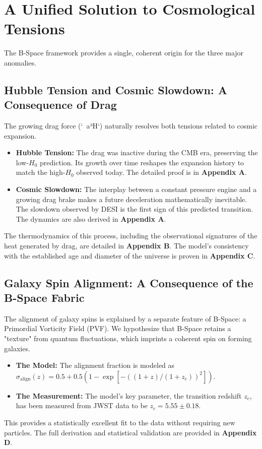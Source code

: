 \documentclass{BSpacePaper} %
\begin{document}
\section{A Unified Solution to Cosmological Tensions}
The B-Space framework provides a single, coherent origin for the three major anomalies.

\subsection{Hubble Tension and Cosmic Slowdown: A Consequence of Drag}
The growing drag force (`~a³H`) naturally resolves both tensions related to cosmic expansion.
\begin{itemize}
    \item \textbf{Hubble Tension:} The drag was inactive during the CMB era, preserving the low-$H_0$ prediction. Its growth over time reshapes the expansion history to match the high-$H_0$ observed today. The detailed proof is in \textbf{Appendix A}.
    \item \textbf{Cosmic Slowdown:} The interplay between a constant pressure engine and a growing drag brake makes a future deceleration mathematically inevitable. The slowdown observed by DESI is the first sign of this predicted transition. The dynamics are also derived in \textbf{Appendix A}.
\end{itemize}
The thermodynamics of this process, including the observational signatures of the heat generated by drag, are detailed in \textbf{Appendix B}. The model's consistency with the established age and diameter of the universe is proven in \textbf{Appendix C}.

\subsection{Galaxy Spin Alignment: A Consequence of the B-Space Fabric}
The alignment of galaxy spins is explained by a separate feature of B-Space: a Primordial Vorticity Field (PVF). We hypothesize that B-Space retains a "texture" from quantum fluctuations, which imprints a coherent spin on forming galaxies.
\begin{itemize}
    \item \textbf{The Model:} The alignment fraction is modeled as $\sigma_{\text{align}}(z) = 0.5 + 0.5 (1 - \exp[-((1+z)/(1+z_c))^2])$.
    \item \textbf{The Measurement:} The model's key parameter, the transition redshift $z_c$, has been measured from JWST data to be $z_c = 5.55 \pm 0.18$.
\end{itemize}
This provides a statistically excellent fit to the data without requiring new particles. The full derivation and statistical validation are provided in \textbf{Appendix D}.
\end{document}
